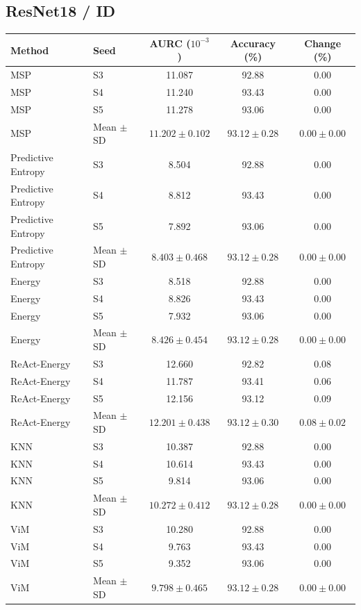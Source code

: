 \subsection*{ResNet18 / ID}
\begingroup
\footnotesize
\setlength{\tabcolsep}{3pt}
\renewcommand{\arraystretch}{1.1}
\begin{longtable}{@{}llccc@{}}
\toprule
Method & Seed & AURC ($10^{-3}$) & Accuracy (\%) & Change (\%) \\
\midrule
\endhead
\bottomrule
\endlastfoot
MSP & S3 & 11.087 & 92.88 & 0.00 \\
MSP & S4 & 11.240 & 93.43 & 0.00 \\
MSP & S5 & 11.278 & 93.06 & 0.00 \\
MSP & Mean $\pm$ SD & $11.202 \pm 0.102$ & $93.12 \pm 0.28$ & $0.00 \pm 0.00$ \\
Predictive Entropy & S3 & 8.504 & 92.88 & 0.00 \\
Predictive Entropy & S4 & 8.812 & 93.43 & 0.00 \\
Predictive Entropy & S5 & 7.892 & 93.06 & 0.00 \\
Predictive Entropy & Mean $\pm$ SD & $8.403 \pm 0.468$ & $93.12 \pm 0.28$ & $0.00 \pm 0.00$ \\
Energy & S3 & 8.518 & 92.88 & 0.00 \\
Energy & S4 & 8.826 & 93.43 & 0.00 \\
Energy & S5 & 7.932 & 93.06 & 0.00 \\
Energy & Mean $\pm$ SD & $8.426 \pm 0.454$ & $93.12 \pm 0.28$ & $0.00 \pm 0.00$ \\
ReAct-Energy & S3 & 12.660 & 92.82 & 0.08 \\
ReAct-Energy & S4 & 11.787 & 93.41 & 0.06 \\
ReAct-Energy & S5 & 12.156 & 93.12 & 0.09 \\
ReAct-Energy & Mean $\pm$ SD & $12.201 \pm 0.438$ & $93.12 \pm 0.30$ & $0.08 \pm 0.02$ \\
KNN & S3 & 10.387 & 92.88 & 0.00 \\
KNN & S4 & 10.614 & 93.43 & 0.00 \\
KNN & S5 & 9.814 & 93.06 & 0.00 \\
KNN & Mean $\pm$ SD & $10.272 \pm 0.412$ & $93.12 \pm 0.28$ & $0.00 \pm 0.00$ \\
ViM & S3 & 10.280 & 92.88 & 0.00 \\
ViM & S4 & 9.763 & 93.43 & 0.00 \\
ViM & S5 & 9.352 & 93.06 & 0.00 \\
ViM & Mean $\pm$ SD & $9.798 \pm 0.465$ & $93.12 \pm 0.28$ & $0.00 \pm 0.00$ \\

\end{longtable}
